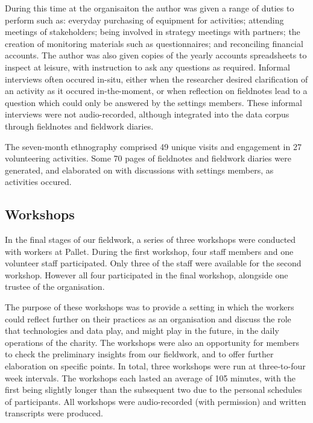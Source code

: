 During this time at the organisaiton the author was given a range of duties to perform such as: everyday purchasing of equipment for activities; attending meetings of stakeholders; being involved in strategy meetings with partners; the creation of monitoring materials such as questionnaires; and reconciling financial accounts. The author was also given copies of the yearly accounts spreadsheets to inspect at leisure, with instruction to ask any questions as required. Informal interviews often occured in-situ, either when the researcher desired clarification of an activity as it occured in-the-moment, or when reflection on fieldnotes lead to a question which could only be answered by the settings members. These informal interviews were not audio-recorded, although integrated into the data corpus through fieldnotes and fieldwork diaries.

The seven-month ethnography comprised 49 unique visits and engagement in 27 volunteering activities. Some 70 pages of fieldnotes and fieldwork diaries were generated, and elaborated on with discussions with settings members, as activities occured.


\subsection{Workshops}
In the final stages of our fieldwork, a series of three workshops were conducted with workers at Pallet. During the first workshop, four staff members and one volunteer staff participated. Only three of the staff were available for the second workshop. However all four participated in the final workshop, alongside one trustee of the organisation.

The purpose of these workshops was to provide a setting in which the workers could reflect further on their practices as an organisation and discuss the role that technologies and data play, and might play in the future, in the daily operations of the charity. The workshops were also an opportunity for members to check the preliminary insights from our fieldwork, and to offer further elaboration on specific points. In total, three workshops were run at three-to-four week intervals. The workshops each lasted an average of 105 minutes, with the first being slightly longer than the subsequent two due to the personal schedules of participants. All workshops were audio-recorded (with permission) and written transcripts were produced.

